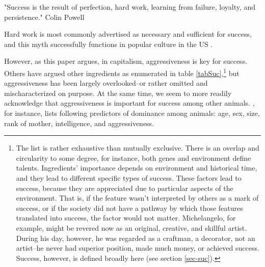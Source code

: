 \documentclass[11pt, letterpaper]{article}
\begin{document}
\begin{spacing}{2.0}
"Success is the result of perfection, hard work, learning from failure, loyalty,
and persistence." Colin Powell

\hspace{.2in}

Hard work is most commonly advertised as necessary and sufficient for success,
and this myth successfully functions in popular culture in the US \citep{aokditella}.  

However, as this paper argues, in capitalism, aggressiveness is key for success. Others have
argued other ingredients as enumerated in table \ref{tabSuc},\footnote{
  The list is rather exhaustive
  than mutually exclusive. There is an overlap and
  circularity to some degree, for instance, both genes and environment define
  talents.
  Ingredients' importance depends on environment and historical time, and they lead to different
  specific types of success.
These factors lead to success, because they are appreciated due to particular
aspects of the environment. That is, if the feature wasn't interpreted by others
as a mark of success, or if the society did not have a pathway by which those features translated into success,
the factor would not matter. Michelangelo, for example,  might be revered now as an
original, creative, and skillful artist. During his day, however, he was regarded as a craftman, a decorator,
not an artist--he never had superior position, made much money, or achieved success.
   Success, however, is defined broadly here (see section \ref{sec-suc}).
}
 but
aggressiveness has been largely overlooked--or rather omitted and
mischaracterized on purpose. At the same time, we seem to more readily
acknowledge that aggressiveness is important for success among other animals. \citet{argyle94},
for instance, lists following predictors of dominance among animals: age, sex,
size, rank of mother, intelligence, and aggressiveness.


\end{spacing}
\end{document}
